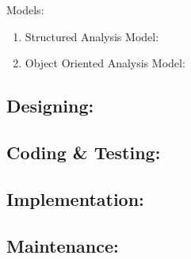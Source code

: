 \documentclass{article}
\begin{document}
		Models:
		\begin{enumerate}
			\item Structured Analysis Model:
			\item Object Oriented Analysis Model:
		\end{enumerate}
		\subsection{Designing:}
		\subsection{Coding \& Testing:}
		\subsection{Implementation:}
		\subsection{Maintenance:}
\end{document}
